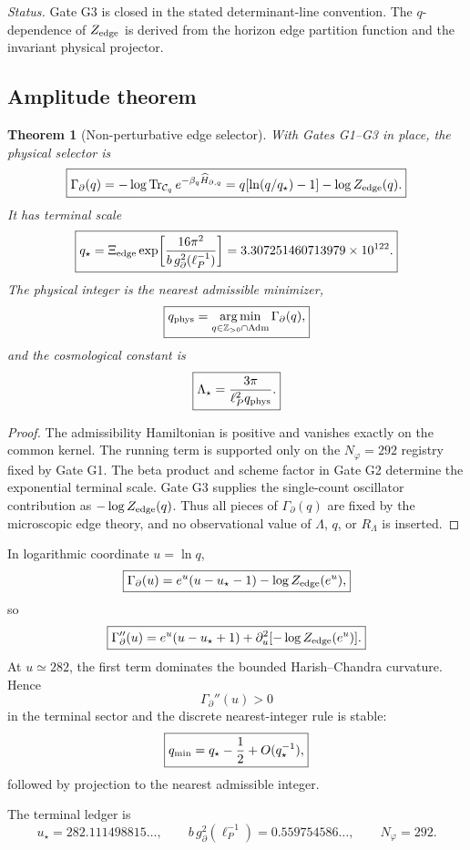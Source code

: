 \documentclass[aps,prd,reprint,nofootinbib,superscriptaddress,floatfix]{revtex4-2}
\numberwithin{equation}{section}
\theoremstyle{definition}
\theoremstyle{plain}
\newtheorem{theorem}{Theorem}[section]
\begin{document}
\noindent\emph{Status.}
Gate G3 is closed in the stated determinant-line convention.  The
\(q\)-dependence of \(Z_{\rm edge}\) is derived from the horizon edge
partition function and the invariant physical projector.

\subsection{Amplitude theorem}

\begin{theorem}[Non-perturbative edge selector]
\label{thm:edge-selector-conditional}
With Gates G1--G3 in place, the physical selector is
\[
\boxed{
\Gamma_\partial(q)
=
-\log
\operatorname{Tr}_{\mathcal C_q}
e^{-\beta_q\widehat H_{\partial,q}}
=
q[\ln(q/q_\star)-1]-\log Z_{\rm edge}(q).
}
\]
It has terminal scale
\[
\boxed{
q_\star
=
\Xi_{\rm edge}
\exp\!\left[
\frac{16\pi^2}{b\,g_\partial^2(\ell_P^{-1})}
\right]
=
3.307251460713979\times10^{122}.
}
\]
The physical integer is the nearest admissible minimizer,
\[
\boxed{
q_{\rm phys}
=
\operatorname*{arg\,min}_{q\in\mathbb Z_{>0}\cap{\rm Adm}}
\Gamma_\partial(q),
}
\]
and the cosmological constant is
\[
\boxed{
\Lambda_\star
=
\frac{3\pi}{\ell_P^2 q_{\rm phys}}.
}
\]
\end{theorem}

\begin{proof}
The admissibility Hamiltonian is positive and vanishes exactly on the common
kernel.  The running term is supported only on the
\(N_\varphi=292\) registry fixed by Gate G1.  The beta product and scheme
factor in Gate G2 determine the exponential terminal scale.  Gate G3 supplies
the single-count oscillator contribution as \(-\log Z_{\rm edge}(q)\).  Thus
all pieces of \(\Gamma_\partial(q)\) are fixed by the microscopic edge theory,
and no observational value of \(\Lambda\), \(q\), or \(R_\Lambda\) is inserted.
\end{proof}

In logarithmic coordinate \(u=\ln q\),
\[
\boxed{
\Gamma_\partial(u)
=
e^u(u-u_\star-1)
-\log Z_{\rm edge}(e^u),
}
\]
so
\[
\boxed{
\Gamma_\partial''(u)
=
e^u(u-u_\star+1)
+
\partial_u^2[-\log Z_{\rm edge}(e^u)].
}
\]
At \(u\simeq282\), the first term dominates the bounded Harish--Chandra
curvature.  Hence
\[
\boxed{\Gamma_\partial''(u)>0}
\]
in the terminal sector and the discrete nearest-integer rule is stable:
\[
\boxed{
q_{\rm min}=q_\star-\frac12+O(q_\star^{-1}),
}
\]
followed by projection to the nearest admissible integer.

The terminal ledger is
\[
\boxed{
u_\star=282.111498815\ldots,
\qquad
b\,g_\partial^2(\ell_P^{-1})=0.559754586\ldots,
\qquad
N_\varphi=292.
}
\]
\end{document}
